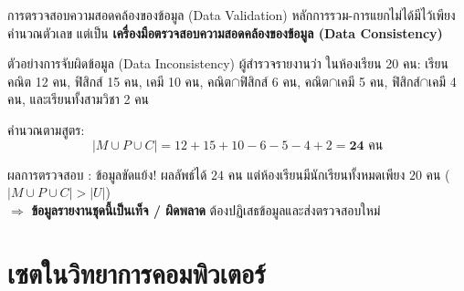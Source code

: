 \begin{frame}{การตรวจสอบความสอดคล้องของข้อมูล (Data Validation)}
  หลักการรวม-การแยกไม่ได้มีไว้เพียงคำนวณตัวเลข แต่เป็น \textbf{เครื่องมือตรวจสอบความสอดคล้องของข้อมูล (Data Consistency)}
  \begin{block}{ตัวอย่างการจับผิดข้อมูล (Data Inconsistency)}
    ผู้สำรวจรายงานว่า ในห้องเรียน 20 คน:
    เรียนคณิต 12 คน, ฟิสิกส์ 15 คน, เคมี 10 คน, คณิต$\cap$ฟิสิกส์ 6 คน, คณิต$\cap$เคมี 5 คน, ฟิสิกส์$\cap$เคมี 4 คน, และเรียนทั้งสามวิชา 2 คน
  \end{block}
  \pause
  คำนวณตามสูตร:
  \[ |M \cup P \cup C| = 12 + 15 + 10 - 6 - 5 - 4 + 2 = \mathbf{24} \text{ คน} \]
  \begin{alertblock}{ผลการตรวจสอบ : ข้อมูลขัดแย้ง!}
    ผลลัพธ์ได้ $24$ คน แต่ห้องเรียนมีนักเรียนทั้งหมดเพียง $20$ คน ($|M \cup P \cup C| > |U|$) \\
    $\Rightarrow$ \textbf{ข้อมูลรายงานชุดนี้เป็นเท็จ / ผิดพลาด} ต้องปฏิเสธข้อมูลและส่งตรวจสอบใหม่
  \end{alertblock}
\end{frame}


\section{เซตในวิทยาการคอมพิวเตอร์}

